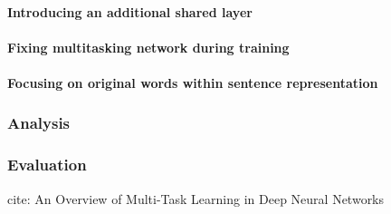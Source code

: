 \paragraph{Introducing an additional shared layer}
\paragraph{Fixing multitasking network during training}
\paragraph{Focusing on original words within sentence representation}
\subsubsection{Analysis}
\subsubsection{Evaluation}

cite: An Overview of Multi-Task Learning
in Deep Neural Networks